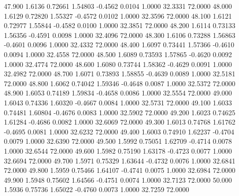   47.900   1.6136   0.72661   1.54803  -0.4562   0.0104   1.0000  32.3331  72.0000
  48.000   1.6129   0.72820   1.55327  -0.4572   0.0102   1.0000  32.3596  72.0000
  48.100   1.6121   0.72977   1.55844  -0.4582   0.0100   1.0000  32.3851  72.0000
  48.200   1.6114   0.73133   1.56356  -0.4591   0.0098   1.0000  32.4096  72.0000
  48.300   1.6106   0.73288   1.56863  -0.4601   0.0096   1.0000  32.4332  72.0000
  48.400   1.6097   0.73441   1.57366  -0.4610   0.0094   1.0000  32.4558  72.0000
  48.500   1.6089   0.73593   1.57865  -0.4620   0.0092   1.0000  32.4774  72.0000
  48.600   1.6080   0.73744   1.58362  -0.4629   0.0091   1.0000  32.4982  72.0000
  48.700   1.6071   0.73893   1.58855  -0.4639   0.0089   1.0000  32.5181  72.0000
  48.800   1.6062   0.74042   1.59346  -0.4648   0.0087   1.0000  32.5372  72.0000
  48.900   1.6053   0.74189   1.59834  -0.4658   0.0086   1.0000  32.5554  72.0000
  49.000   1.6043   0.74336   1.60320  -0.4667   0.0084   1.0000  32.5731  72.0000
  49.100   1.6033   0.74481   1.60804  -0.4676   0.0083   1.0000  32.5902  72.0000
  49.200   1.6023   0.74625   1.61284  -0.4686   0.0082   1.0000  32.6069  72.0000
  49.300   1.6013   0.74768   1.61762  -0.4695   0.0081   1.0000  32.6232  72.0000
  49.400   1.6003   0.74910   1.62237  -0.4704   0.0079   1.0000  32.6390  72.0000
  49.500   1.5992   0.75051   1.62709  -0.4714   0.0078   1.0000  32.6544  72.0000
  49.600   1.5982   0.75190   1.63178  -0.4723   0.0077   1.0000  32.6694  72.0000
  49.700   1.5971   0.75329   1.63644  -0.4732   0.0076   1.0000  32.6841  72.0000
  49.800   1.5959   0.75466   1.64107  -0.4741   0.0075   1.0000  32.6984  72.0000
  49.900   1.5948   0.75602   1.64566  -0.4751   0.0074   1.0000  32.7123  72.0000
  50.000   1.5936   0.75736   1.65022  -0.4760   0.0073   1.0000  32.7259  72.0000
